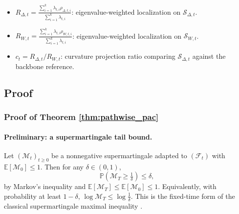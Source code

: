 \documentclass[10pt]{article} %
\begin{document}
\begin{itemize}
\item $R_{\Delta,t}=\frac{\sum_{i=1}^k\lambda_{t,i}\rho_{\Delta,t,i}}{\sum_{i=1}^k\lambda_{t,i}}$: eigenvalue-weighted localization on $\mathcal S_{\Delta,t}$.
\item $R_{W,t}=\frac{\sum_{i=1}^k\lambda_{t,i}\rho_{W,t,i}}{\sum_{i=1}^k\lambda_{t,i}}$: eigenvalue-weighted localization on $\mathcal S_{W,t}$.
\item $c_t=R_{\Delta,t}/R_{W,t}$: curvature projection ratio comparing $\mathcal S_{\Delta,t}$ against the backbone reference. 
\end{itemize}


\subsection{Proof}

\subsubsection{Proof of Theorem \ref{thm:pathwise_pac}}
\label{proof:theorem all}

\paragraph{Preliminary: a supermartingale tail bound.}
Let $(\mathcal M_t)_{t\ge0}$ be a nonnegative supermartingale adapted to $(\mathcal F_t)$ with $\mathbb E[\mathcal M_0]\le 1$.
Then for any $\delta\in(0,1)$,
\[
\mathbb P\!\left(\mathcal M_T \ge \tfrac{1}{\delta}\right)
\le \delta,
\]
by Markov's inequality and $\mathbb E[\mathcal M_T]\le \mathbb E[\mathcal M_0]\le 1$.
Equivalently, with probability at least $1-\delta$, $\log \mathcal M_T \le \log \tfrac{1}{\delta}$.
This is the fixed-time form of the classical supermartingale maximal inequality  \citet{yangshuxue}.
\end{document}
